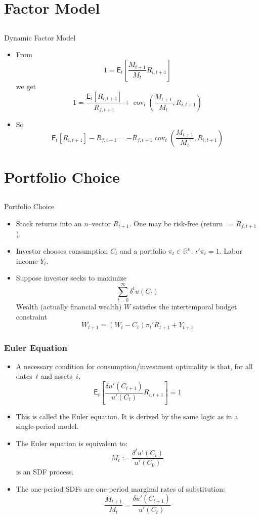 \documentclass[10pt]{beamer}
\DeclareMathOperator{\cov}{cov}
\newcommand{\bi}{\begin{itemize}}
\newcommand{\ei}{\end{itemize}}
\newcommand{\im}{\item}
\newcommand{\mye}{\ensuremath{\mathsf{E}}}
\newcommand{\myreal}{\ensuremath{\mathbb{R}}}
\newcommand{\bfr}{\begin{frame}}
\begin{document}
\section{Factor Model}\subsection{}

\begin{frame}{Dynamic Factor Model}
\bi 
\im From
$$ 1 = \mye_t\left[\frac{M_{t+1}}{M_t}R_{i,t+1}\right]$$
we get
$$ 1 = \frac{\mye_t[R_{i,t+1}]}{R_{f,t+1}} + \cov_t \left(\frac{M_{t+1}}{M_t},R_{i,t+1}\right)$$
\im So 
$$\mye_t[R_{i,t+1}] - R_{f,t+1} = - R_{f,t+1}\cov_t \left(\frac{M_{t+1}}{M_t},R_{i,t+1}\right)$$
\ei 
\end{frame}


\section{Portfolio Choice}\subsection{}

\begin{frame}{Portfolio Choice}
\bi \im 
 Stack returns into an $n$--vector $R_{t+1}$.  One may be risk-free (return $\,= R_{f,t+1}$).

 \im Investor chooses consumption $C_t$ and a portfolio $\pi_t \in \myreal^n$. $\iota'\pi_t=1$.  Labor income $Y_t$.

\im Suppose investor seeks to maximize
$$\sum_{t=0}^\infty \delta^t u(C_t)$$
 Wealth (actually financial wealth) $W$ satisfies the \alert{intertemporal budget constraint}
$$W_{t+1} = (W_t-C_t)\pi_t'R_{t+1} + Y_{t+1}$$
\ei
 \end{frame}



\bfr\frametitle{Euler Equation}
\bi \im 
A necessary condition for consumption/investment optimality is that, for all dates~$t$ and assets~$i$,
$$\mye_t\left[\frac{\delta u'(C_{t+1})}{u'(C_t)}R_{i,t+1}\right] = 1$$
 \im This is called the Euler equation.  It is derived by the same logic as in a single-period model.

 \im The Euler equation is equivalent to: 
$$M_t := \frac{\delta^t u'(C_t)}{u'(C_0)}$$
is an SDF process.
\im The one-period SDFs are one-period marginal rates of substitution:
$$\frac{M_{t+1}}{M_t} = \frac{\delta u'(C_{t+1})}{u'(C_t)}$$
\ei 
\end{frame}
\end{document}

